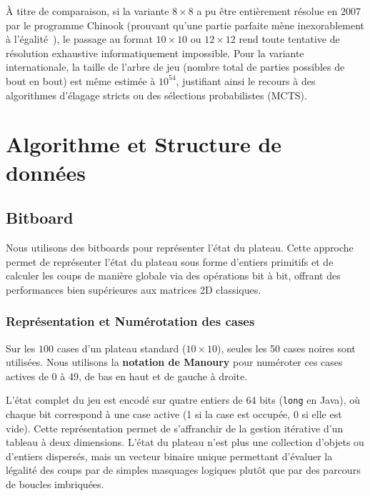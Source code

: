 \documentclass[a4paper]{article}
\begin{document}
À titre de comparaison, si la variante $8 \times 8$ a pu être entièrement résolue en 2007 par le programme Chinook (prouvant qu'une partie parfaite mène inexorablement
 à l'égalité~\cite{checkers_solved}), le passage au format $10 \times 10$ ou $12 \times 12$ rend toute
  tentative de résolution exhaustive informatiquement impossible. Pour la variante internationale, la taille de l'arbre de jeu (nombre total de parties possibles
   de bout en bout) est même estimée à $10^{54}$, justifiant ainsi le recours à des algorithmes d'élagage stricts ou des sélections probabilistes (MCTS).

\section{Algorithme et Structure de données}
\label{sec:algo}

\subsection{Bitboard}

Nous utilisons des bitboards pour représenter l'état du plateau. Cette approche permet de représenter l'état du plateau sous forme d'entiers primitifs et de calculer les 
coups de manière globale via des opérations bit à bit, offrant des performances bien supérieures aux matrices 2D classiques.

\subsubsection{Représentation et Numérotation des cases}

Sur les \(100\) cases d'un plateau standard (\(10 \times 10\)), seules les 50 cases noires sont utilisées. Nous utilisons la \textbf{notation de Manoury} pour numéroter 
ces cases actives de 0 à 49, de bas en haut et de gauche à droite.

L'état complet du jeu est encodé sur quatre entiers de 64 bits (\texttt{long} en Java), où chaque bit correspond à une case active (1 si la case est occupée, 0 si elle est vide). 
Cette représentation permet de s'affranchir de la gestion itérative d'un tableau à deux dimensions. L'état du plateau n'est plus une collection d'objets ou d'entiers dispersés,
 mais un vecteur binaire unique permettant d'évaluer la légalité des coups par de simples masquages logiques plutôt que par des parcours de boucles imbriquées.
\end{document}
